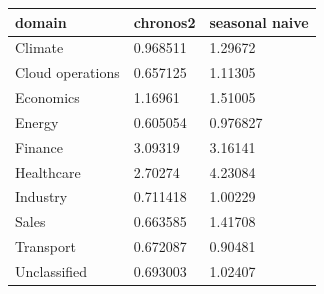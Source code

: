 \begin{tabular}{lll}
\toprule
domain & chronos2 & seasonal naive \\
\midrule
Climate & 0.968511 & 1.29672 \\
Cloud operations & 0.657125 & 1.11305 \\
Economics & 1.16961 & 1.51005 \\
Energy & 0.605054 & 0.976827 \\
Finance & 3.09319 & 3.16141 \\
Healthcare & 2.70274 & 4.23084 \\
Industry & 0.711418 & 1.00229 \\
Sales & 0.663585 & 1.41708 \\
Transport & 0.672087 & 0.90481 \\
Unclassified & 0.693003 & 1.02407 \\
\bottomrule
\end{tabular}
